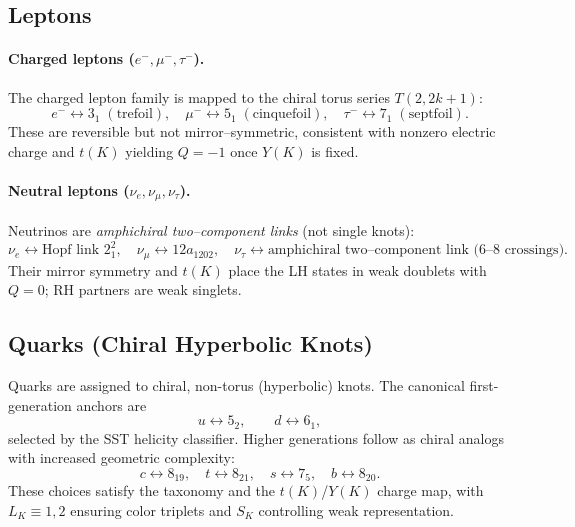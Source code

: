 \documentclass[smallextended]{svjour3}       %
\begin{document}
    \subsection{Leptons}

        \paragraph{Charged leptons ($e^-,\mu^-,\tau^-$).}
            The charged lepton family is mapped to the chiral torus series $T(2,2k{+}1)$:
            \[
                e^- \leftrightarrow 3_1 \;(\text{trefoil}),\quad
                \mu^- \leftrightarrow 5_1 \;(\text{cinquefoil}),\quad
                \tau^- \leftrightarrow 7_1 \;(\text{septfoil}).
            \]
            These are reversible but not mirror–symmetric, consistent with nonzero electric charge and $t(K)$ yielding $Q=-1$ once $Y(K)$ is fixed.

        \paragraph{Neutral leptons ($\nu_e,\nu_\mu,\nu_\tau$).}
            Neutrinos are \emph{amphichiral two–component links} (not single knots):
            \[
                \nu_e \leftrightarrow \text{Hopf link } 2^2_{1},\quad
                \nu_\mu \leftrightarrow 12a_{1202},\quad
                \nu_\tau \leftrightarrow \text{amphichiral two–component link (6--8 crossings).}
            \]
            Their mirror symmetry and $t(K)$ place the LH states in weak doublets with $Q=0$; RH partners are weak singlets.

    \subsection{Quarks (Chiral Hyperbolic Knots)}

    Quarks are assigned to chiral, non-torus (hyperbolic) knots. The canonical first-generation anchors are
    \[
        u \leftrightarrow 5_2,\qquad d \leftrightarrow 6_1,
    \]
    selected by the SST helicity classifier. Higher generations follow as chiral analogs with increased geometric complexity:
    \[
        c \leftrightarrow 8_{19},\quad
        t \leftrightarrow 8_{21},\quad
        s \leftrightarrow 7_{5},\quad
        b \leftrightarrow 8_{20}.
    \]
    These choices satisfy the taxonomy and the $t(K)$/$Y(K)$ charge map, with $L_K\!\equiv\!1,2$ ensuring color triplets and $S_K$ controlling weak representation.
\end{document}
